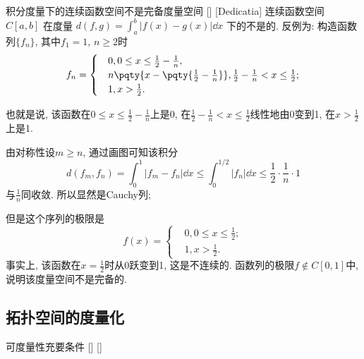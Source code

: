 \documentclass[UTF8]{ctexart}
\begin{document}
            \begin{cxmp}
                {积分度量下的连续函数空间不是完备度量空间}
                []
                [Dedicatia]
                连续函数空间 $C[a,b]$ 在度量 $d(f,g)=\int_{a}^b|f(x)-g(x)|\dd{x}$ 下的 不是 的. 反例为: 构造函数列$\{f_n\}$, 其中$f_1=1$, $n\geq 2$时
                \[f_n=\begin{cases}
                    &0, 0\leq x\leq \frac{1}{2}-\frac{1}{n},\\
                    &n\pqty{x-\pqty{\frac{1}{2}-\frac{1}{n}}}, \frac{1}{2}-\frac{1}{n}< x\leq \frac{1}{2};\\
                    &1, x>\frac{1}{2}.
                \end{cases}\]

                也就是说, 该函数在$0\leq x\leq \frac{1}{2}-\frac{1}{n}$上是0, 在$\frac{1}{2}-\frac{1}{n}< x\leq \frac{1}{2}$线性地由0变到1, 在$x>\frac{1}{2}$上是1.
                
                由对称性设$m\geq n$, 通过画图可知该积分
                \[d(f_m,f_n)=\int_0^1|f_m-f_n|\dd{x}\leq\int_0^{1/2}|f_n|\dd{x}\leq\frac{1}{2}\cdot\frac{1}{n}\cdot 1\]
                与$\frac{1}{n}$同收敛. 所以显然是Cauchy列; 
                
                但是这个序列的极限是
                \[f(x)=\begin{cases}
                    &0, 0\leq x\leq\frac{1}{2};\\
                    &1, x>\frac{1}{2}.
                \end{cases}\]
                事实上, 该函数在$x=\frac{1}{2}$时从0跃变到1, 这是不连续的. 函数列的极限$f\notin C[0,1]$中, 说明该度量空间不是完备的. 
            \end{cxmp}

        \subsection{拓扑空间的度量化}
            
            \begin{thm}
                []
                {可度量性充要条件}
                []
                []
            \end{thm}
\end{document}
